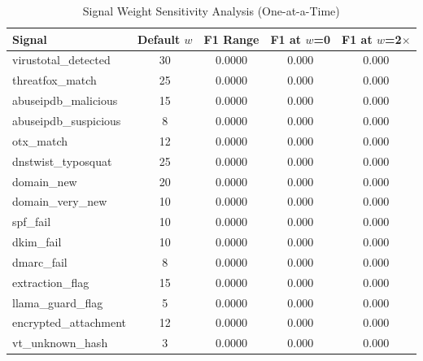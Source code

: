 \begin{table}[htbp]
\centering
\caption{Signal Weight Sensitivity Analysis (One-at-a-Time)}
\label{tab:weight-sensitivity}
\begin{tabular}{lcccc}
\toprule
Signal & Default $w$ & F1 Range & F1 at $w$=0 & F1 at $w$=2$\times$ \\
\midrule
  virustotal\_detected & 30 & 0.0000 & 0.000 & 0.000 \\
  threatfox\_match & 25 & 0.0000 & 0.000 & 0.000 \\
  abuseipdb\_malicious & 15 & 0.0000 & 0.000 & 0.000 \\
  abuseipdb\_suspicious & 8 & 0.0000 & 0.000 & 0.000 \\
  otx\_match & 12 & 0.0000 & 0.000 & 0.000 \\
  dnstwist\_typosquat & 25 & 0.0000 & 0.000 & 0.000 \\
  domain\_new & 20 & 0.0000 & 0.000 & 0.000 \\
  domain\_very\_new & 10 & 0.0000 & 0.000 & 0.000 \\
  spf\_fail & 10 & 0.0000 & 0.000 & 0.000 \\
  dkim\_fail & 10 & 0.0000 & 0.000 & 0.000 \\
  dmarc\_fail & 8 & 0.0000 & 0.000 & 0.000 \\
  extraction\_flag & 15 & 0.0000 & 0.000 & 0.000 \\
  llama\_guard\_flag & 5 & 0.0000 & 0.000 & 0.000 \\
  encrypted\_attachment & 12 & 0.0000 & 0.000 & 0.000 \\
  vt\_unknown\_hash & 3 & 0.0000 & 0.000 & 0.000 \\
\bottomrule
\end{tabular}
\end{table}